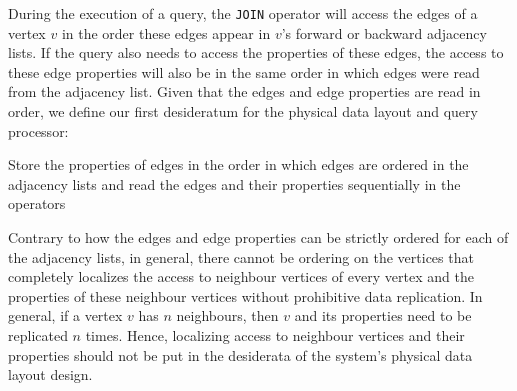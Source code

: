 \begin{guideline}
	\label{ssec:edges-ordered}
	During the execution of a query, the \texttt{JOIN} operator will access the edges of a vertex $v$ in the order these edges appear in $v$'s forward or backward adjacency lists. If the query also needs to access the properties of these edges, the access to these edge properties will also be in the same order in which edges were read from the adjacency list. Given that the edges and edge properties are read in order, we define our first desideratum for the physical data layout and query processor:
	
	\begin{desideratum}
		\label{des1}
		Store the properties of edges in the order in which edges are ordered in the adjacency lists and read the edges and their properties sequentially in the operators
	\end{desideratum}
	
\end{guideline}

\begin{guideline}
	\label{gdln:vertices-unordered}
	Contrary to how the edges and edge properties can be strictly ordered for each of the adjacency lists, in general, there cannot be ordering on the vertices that completely localizes the access to neighbour vertices of every vertex and the properties of these neighbour vertices without prohibitive data replication. In general, if a vertex $v$ has $n$ neighbours, then $v$ and its properties need to be replicated $n$ times. Hence, localizing access to neighbour vertices and their properties should not be put in the desiderata of the system's physical data layout design. 	
\end{guideline}

